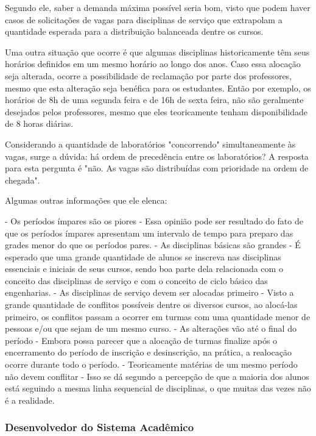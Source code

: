 Segundo ele, saber a demanda máxima possível seria bom, visto que podem haver casos de solicitações de vagas para disciplinas de serviço que extrapolam a quantidade esperada para a distribuição balanceada dentre os cursos.

Uma outra situação que ocorre é que algumas disciplinas historicamente têm seus horários definidos em um mesmo horário ao longo dos anos. Caso essa alocação seja alterada, ocorre a possibilidade de reclamação por parte dos professores, mesmo que esta alteração seja benéfica para os estudantes. Então por exemplo, os horários de 8h de uma segunda feira e de 16h de sexta feira, não são geralmente desejados pelos professores, mesmo que eles teoricamente tenham disponibilidade de 8 horas diárias.

Considerando a quantidade de laboratórios "concorrendo" simultaneamente às vagas, surge a dúvida: há ordem de precedência entre os laboratórios? A resposta para esta pergunta é "não. As vagas são distribuídas com prioridade na ordem de chegada".

Algumas outras informações que ele elenca:

- Os períodos ímpares são os piores
  - Essa opinião pode ser resultado do fato de que os períodos ímpares apresentam um intervalo de tempo para preparo das grades menor do que os períodos pares.
- As disciplinas básicas são grandes
  - É esperado que uma grande quantidade de alunos se inscreva nas disciplinas essenciais e iniciais de seus cursos, sendo boa parte dela relacionada com o conceito das disciplinas de serviço e com o conceito de ciclo básico das engenharias.
- As disciplinas de serviço devem ser alocadas primeiro
  - Visto a grande quantidade de conflitos possíveis dentre os diversos cursos, ao alocá-las primeiro, os conflitos passam a ocorrer em turmas com uma quantidade menor de pessoas e/ou que sejam de um mesmo curso.
- As alterações vão até o final do período
  - Embora possa parecer que a alocação de turmas finalize após o encerramento do período de inscrição e desinscrição, na prática, a realocação ocorre durante todo o período.
- Teoricamente matérias de um mesmo período não devem conflitar
  - Isso se dá segundo a percepção de que a maioria dos alunos está seguindo a mesma linha sequencial de disciplinas, o que muitas das vezes não é a realidade.

\subsubsection{Desenvolvedor do Sistema Acadêmico} %

